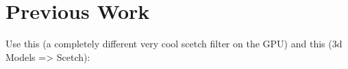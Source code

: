 \section{Previous Work}
Use this (a completely different very cool scetch filter on the GPU) \cite{Lu:2010:IPS} and this (3d Models => Scetch): \cite{Benard:2012:ASC}
